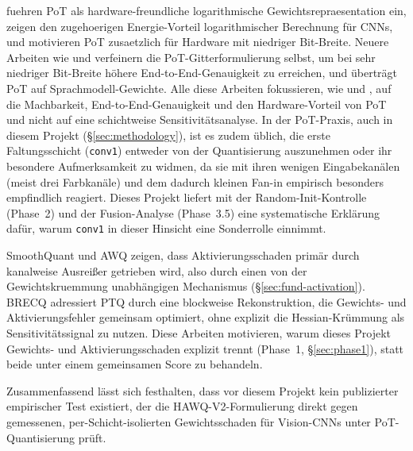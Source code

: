 \citet{miyashita_pot_2016} fuehren PoT als hardware-freundliche logarithmische Gewichtsrepraesentation ein, \citet{lee_lognet_2017} zeigen den zugehoerigen Energie-Vorteil logarithmischer Berechnung für CNNs, und \citet{przewlocka_rus_pot_2022} motivieren PoT zusaetzlich für Hardware mit niedriger Bit-Breite. Neuere Arbeiten wie \citet{kim_nonzerogrid_2023} und \citet{li_denseshift_2023} verfeinern die PoT-Gitterformulierung selbst, um bei sehr niedriger Bit-Breite höhere End-to-End-Genauigkeit zu erreichen, und \citet{elgenedy_pot_llm_2025} überträgt PoT auf Sprachmodell-Gewichte. Alle diese Arbeiten fokussieren, wie \citet{miyashita_pot_2016} und \citet{przewlocka_rus_pot_2022}, auf die Machbarkeit, End-to-End-Genauigkeit und den Hardware-Vorteil von PoT und nicht auf eine schichtweise Sensitivitätsanalyse. In der PoT-Praxis, auch in diesem Projekt (\S\ref{sec:methodology}), ist es zudem üblich, die erste Faltungsschicht (\texttt{conv1}) entweder von der Quantisierung auszunehmen oder ihr besondere Aufmerksamkeit zu widmen, da sie mit ihren wenigen Eingabekanälen (meist drei Farbkanäle) und dem dadurch kleinen Fan-in empirisch besonders empfindlich reagiert. Dieses Projekt liefert mit der Random-Init-Kontrolle (Phase~2) und der Fusion-Analyse (Phase~3.5) eine systematische Erklärung dafür, warum \texttt{conv1} in dieser Hinsicht eine Sonderrolle einnimmt.
\par\medskip

SmoothQuant \citep{xiao_smoothquant_2023} und AWQ \citep{lin_awq_2024} zeigen, dass Aktivierungsschaden primär durch kanalweise Ausreißer getrieben wird, also durch einen von der Gewichtskruemmung unabhängigen Mechanismus (\S\ref{sec:fund-activation}). BRECQ \citep{li_brecq_2021} adressiert PTQ durch eine blockweise Rekonstruktion, die Gewichts- und Aktivierungsfehler gemeinsam optimiert, ohne explizit die Hessian-Krümmung als Sensitivitätssignal zu nutzen. Diese Arbeiten motivieren, warum dieses Projekt Gewichts- und Aktivierungsschaden explizit trennt (Phase~1, \S\ref{sec:phase1}), statt beide unter einem gemeinsamen Score zu behandeln.
\par\medskip

Zusammenfassend lässt sich festhalten, dass vor diesem Projekt kein publizierter empirischer Test existiert, der die HAWQ-V2-Formulierung direkt gegen gemessenen, per-Schicht-isolierten Gewichtsschaden für Vision-CNNs unter PoT-Quantisierung prüft.